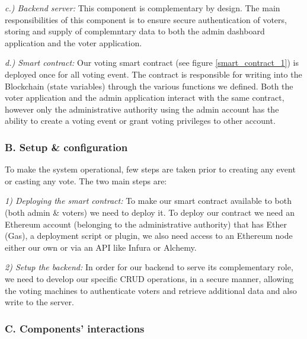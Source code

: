 \textit{c.) Backend server:} This component is complementary by design. The main responsibilities of this component is to ensure secure authentication of voters, storing and supply of complemntary data to both the admin dashboard application and the voter application.

\textit{d.) Smart contract:} Our voting smart contract (see figure \ref{smart_contract_1}) is deployed once for all voting event. The contract is responsible for writing into the Blockchain (state variables) through the various functions we defined. Both the voter application and the admin application interact with the same contract, however only the administrative authority using the admin account has the ability to create a voting event or grant voting privileges to other account.


\subsubsection{B. Setup \& configuration}

To make the system operational, few steps are taken prior to creating any event or casting any vote. The two main steps are:

\textit{1) Deploying the smart contract:} To make our smart contract available to both (both admin \& voters) we need to deploy it. To deploy our contract we need an Ethereum account (belonging to the administrative authority) that has Ether (Gas), a deployment script or plugin, we also need access to an Ethereum node either our own or via an API like Infura\cite{EthereumAPIIPFS} or Alchemy\cite{AlchemyBlockchainDeveloper}.

\textit{2) Setup the backend:} In order for our backend to serve its complementary role, we need to develop our specific \acrshort{CRUD} operations, in a secure manner, allowing the voting machines to authenticate voters and retrieve additional data and also write to the server.

\subsubsection{C. Components' interactions}

